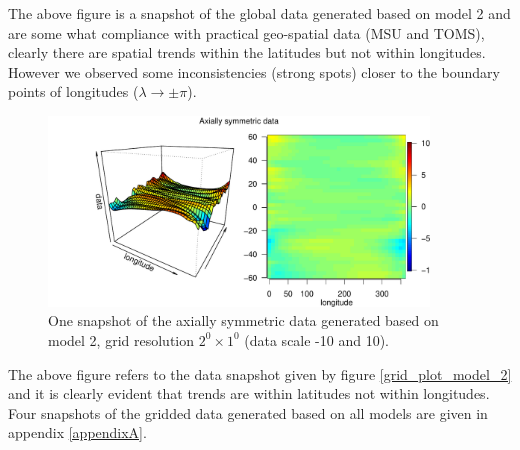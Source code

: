 The above figure is a snapshot of the global data generated based on model 2 and are some what compliance with practical geo-spatial data (MSU and TOMS), clearly there are spatial trends within the latitudes but not within longitudes. However we observed some inconsistencies (strong spots) closer to the boundary points of longitudes ($\lambda \rightarrow \pm\pi$). 

\begin{figure}[H]
	\label{grid_plot_model2_sim2}
	\begin{center}
		\includegraphics [width=0.9\textwidth ]{graphs/Data_sample_120_model2_density.pdf}
		\caption{One snapshot of the axially symmetric data generated based on model 2, grid resolution $2^0\times 1^0$ (data scale -10 and 10).}
	\end{center}
\end{figure}

The above figure refers to the data snapshot given by figure \eqref{grid_plot_model_2} and it is clearly evident that trends are within latitudes not within longitudes. Four snapshots of the gridded data generated based on all models are given in appendix \ref{appendixA}.

%
